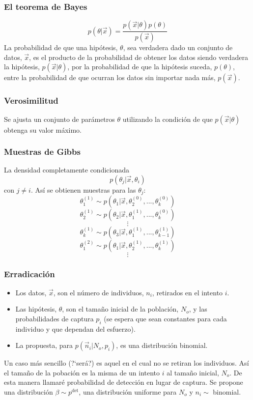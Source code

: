 \begin{frame}
\frametitle{El teorema de Bayes}
\begin{equation} %
p(\theta|\vec x) = \frac{p(\vec x|\theta)p(\theta)}{p(\vec x)}
\end{equation}
La probabilidad de que una hip\'otesis, $\theta$, sea verdadera dado un
conjunto de datos, $\vec x$, es el producto de la probabilidad de obtener los
datos siendo verdadera la hip\'otesis, $p(\vec x|\theta)$, por la probabilidad
de que la hip\'otesis suceda, $p(\theta)$, entre la probabilidad de que ocurran
los datos sin importar nada m\'as, $p(\vec x)$.
\end{frame} %
\begin{frame}
\frametitle{Verosimilitud}
Se ajusta un conjunto de par\'ametros $\theta$ utilizando la condici\'on de que
$p(\vec x|\theta)$ obtenga su valor m\'aximo.
\end{frame}
\begin{frame}
\frametitle{Muestras de Gibbs}
La densidad completamente condicionada
$$
p(\theta_j|\vec x,\theta_i)
$$
con $j\neq i$. As\'i se obtienen muestras para las $\theta_j$:
$$\theta^{(1)}_{1}\sim p(\theta_1|\vec x,\theta^{(0)}_2,...,\theta^{(0)}_k)$$
$$\theta^{(1)}_{2}\sim p(\theta_2|\vec x,\theta^{(1)}_1,...,\theta^{(0)}_k)$$
$$\vdots$$
$$\theta^{(1)}_{k}\sim p(\theta_3|\vec x,\theta^{(1)}_1,...,\theta^{(1)}_{k-1})$$
$$\theta^{(2)}_{1}\sim p(\theta_1|\vec x,\theta^{(1)}_2,...,\theta^{(1)}_k)$$
$$\vdots$$
\end{frame}
\begin{frame}
\frametitle{Erradicaci\'on}
\begin{itemize}
  \item Los datos, $\vec x$, son el n\'umero de individuos, $n_i$, retirados en el
  intento $i$.
  \item Las hip\'otesis, $\theta$, son el tama\~no inicial de la poblaci\'on,
  $N_o$, y las probabilidades de captura $p_i$ (se espera que sean constantes
  para cada individuo y que dependan del esfuerzo).
  \item La propuesta, para $p(\vec n_i|N_o,p_i)$, es una distribuci\'on
  binomial.
\end{itemize}
\end{frame}
\begin{frame}
Un caso m\'as sencillo (?`ser\'a?) es aquel en el cual no se retiran los
individuos. As\'i el tama\~no de la pobaci\'on es la misma de un intento $i$ al
tama\~no inicial, $N_o$. De esta manera llamar\'e probabilidad de detecci\'on en
lugar de captura.
Se propone una distribuci\'on $\beta\sim p^{\mbox{det}}$, una distribuci\'on
uniforme para $N_o$ y $n_i\sim$ binomial.
\end{frame}
